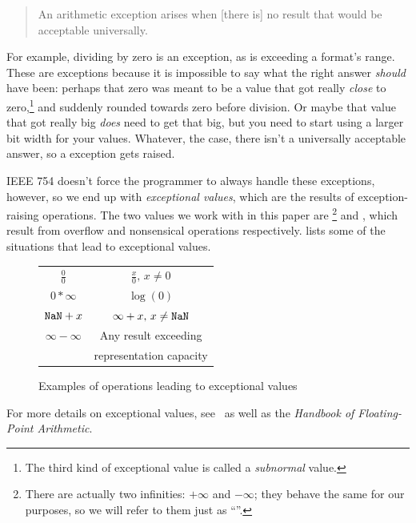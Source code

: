 \documentclass{juliacon}
\begin{document}
\begin{quote}
An arithmetic exception arises when [there is] no result that would be acceptable universally.
\end{quote}

For example, dividing by zero is an exception, as is exceeding a \fp{} format's range.
These are exceptions because it is impossible to say what the right answer \emph{should} have been: perhaps that zero was meant to be a value that got really \emph{close} to zero,\footnote{The third kind of exceptional value is called a \emph{subnormal} value.} and suddenly rounded towards zero before division.
Or maybe that value that got really big \emph{does} need to get that big, but you need to start using a larger bit width for your \fp{} values.
Whatever, the case, there isn't a universally acceptable answer, so a \fp{} exception gets raised.

IEEE 754 doesn't force the programmer to always handle these exceptions, however, so we end up with \emph{exceptional values}, which are the results of exception-raising operations.
The two values we work with in this paper are \Inf{}\footnote{There are actually two infinities: $+\infty$ and $-\infty$; they behave the same for our purposes, so we will refer to them just as ``\Inf{}''.} and \NaN{}, which result from overflow and nonsensical operations respectively.
 lists some of the situations that lead to exceptional values.

\begin{figure}[t]
  \centering
  \label{fig:nan-gens}
  \begin{tabular}{c | c}
    \NaN{} & \Inf{} \\
    \hline
    $\tfrac{0}{0}$ & $\tfrac{x}{0},\, x \neq 0$ \\
    $0 * \infty$ & $\log{(0)}$ \\
    $\text{\texttt{NaN}} + x$ & $\infty + x,\, x \neq \text{\texttt{NaN}}$ \\
    $\infty - \infty$ & Any result exceeding \\
    & representation capacity
  \end{tabular}
  \caption{Examples of operations leading to exceptional values}
\end{figure}

For more details on exceptional values, see~\cite{knuthArtComputerProgramming1997,torontoPracticallyAccurateFloatingPoint2014} as well as the \textit{Handbook of Floating-Point Arithmetic}.~\cite{mullerHandbookFloatingPointArithmetic2018}
\end{document}
